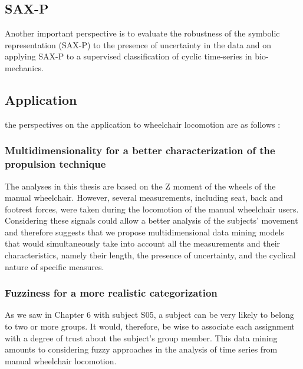 \subsection*{SAX-P}
Another important perspective is to evaluate the robustness of the symbolic representation (SAX-P) to the presence of uncertainty in the data and on applying SAX-P to a supervised classification of cyclic time-series in bio-mechanics.

\subsection*{Application}

the perspectives on the application to wheelchair locomotion are as follows : 

\subsubsection*{Multidimensionality for a better characterization of the propulsion technique}
The analyses in this thesis are based on the Z moment of the wheels of the manual wheelchair. However, several measurements, including seat, back and footrest forces, were taken during the locomotion of the manual wheelchair users. Considering these signals could allow a better analysis of the subjects' movement and therefore suggests that we propose multidimensional data mining models that would simultaneously take into account all the measurements and their characteristics, namely their length, the presence of uncertainty, and the cyclical nature of specific measures.
\subsubsection*{Fuzziness for a more realistic categorization}
As we saw in Chapter 6 with subject S05, a subject can be very likely to belong to two or more groups. It would, therefore, be wise to associate each assignment with a degree of trust about the subject's group member. This data mining amounts to considering fuzzy approaches in the analysis of time series from manual wheelchair locomotion.